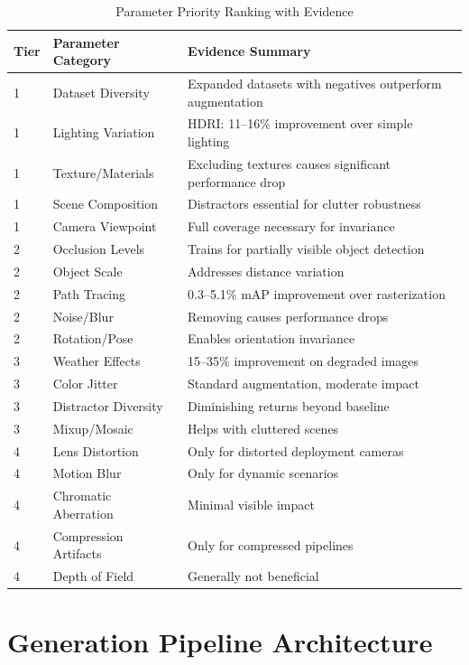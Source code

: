 \begin{table}[htbp]
\centering
\caption{Parameter Priority Ranking with Evidence}
\label{tab:priority_ranking}
\begin{tabular}{p{1cm}p{3.5cm}p{6cm}}
\hline
\textbf{Tier} & \textbf{Parameter Category} & \textbf{Evidence Summary} \\
\hline
1 & Dataset Diversity & Expanded datasets with negatives outperform augmentation \\
1 & Lighting Variation & HDRI: 11--16\% improvement over simple lighting \\
1 & Texture/Materials & Excluding textures causes significant performance drop \\
1 & Scene Composition & Distractors essential for clutter robustness \\
1 & Camera Viewpoint & Full coverage necessary for invariance \\
\hline
2 & Occlusion Levels & Trains for partially visible object detection \\
2 & Object Scale & Addresses distance variation \\
2 & Path Tracing & 0.3--5.1\% mAP improvement over rasterization \\
2 & Noise/Blur & Removing causes performance drops \\
2 & Rotation/Pose & Enables orientation invariance \\
\hline
3 & Weather Effects & 15--35\% improvement on degraded images \\
3 & Color Jitter & Standard augmentation, moderate impact \\
3 & Distractor Diversity & Diminishing returns beyond baseline \\
3 & Mixup/Mosaic & Helps with cluttered scenes \\
\hline
4 & Lens Distortion & Only for distorted deployment cameras \\
4 & Motion Blur & Only for dynamic scenarios \\
4 & Chromatic Aberration & Minimal visible impact \\
4 & Compression Artifacts & Only for compressed pipelines \\
4 & Depth of Field & Generally not beneficial \\
\hline
\end{tabular}
\end{table}

\section{Generation Pipeline Architecture}
\label{sec:pipeline_architecture}

